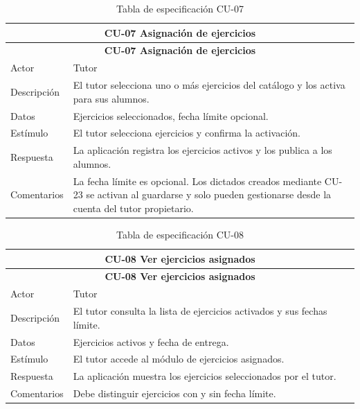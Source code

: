 
\begin{longtable}{|p{4cm}|p{11cm}|}
\caption{Tabla de especificación CU-07}
\label{tab:cu07} \\

\hline
\multicolumn{2}{|c|}{\textbf{CU-07 Asignación de ejercicios}} \\
\hline
\endfirsthead

\hline
\multicolumn{2}{|c|}{\textbf{CU-07 Asignación de ejercicios}} \\
\hline
\endhead

\hline
\endfoot
\endlastfoot

Actor & Tutor \\
\hline
Descripción & El tutor selecciona uno o más ejercicios del catálogo y los activa para sus alumnos. \\
\hline
Datos & Ejercicios seleccionados, fecha límite opcional. \\
\hline
Estímulo & El tutor selecciona ejercicios y confirma la activación. \\
\hline
Respuesta & La aplicación registra los ejercicios activos y los publica a los alumnos. \\
\hline
Comentarios & La fecha límite es opcional. Los dictados creados mediante CU-23 se activan al guardarse y solo pueden gestionarse desde la cuenta del tutor propietario. \\
\hline

\end{longtable}


\begin{longtable}{|p{4cm}|p{11cm}|}
\caption{Tabla de especificación CU-08}
\label{tab:cu08} \\

\hline
\multicolumn{2}{|c|}{\textbf{CU-08 Ver ejercicios asignados}} \\
\hline
\endfirsthead

\hline
\multicolumn{2}{|c|}{\textbf{CU-08 Ver ejercicios asignados}} \\
\hline
\endhead

\hline
\endfoot
\endlastfoot

Actor & Tutor \\
\hline
Descripción & El tutor consulta la lista de ejercicios activados y sus fechas límite. \\
\hline
Datos & Ejercicios activos y fecha de entrega. \\
\hline
Estímulo & El tutor accede al módulo de ejercicios asignados. \\
\hline
Respuesta & La aplicación muestra los ejercicios seleccionados por el tutor. \\
\hline
Comentarios & Debe distinguir ejercicios con y sin fecha límite. \\
\hline

\end{longtable}

